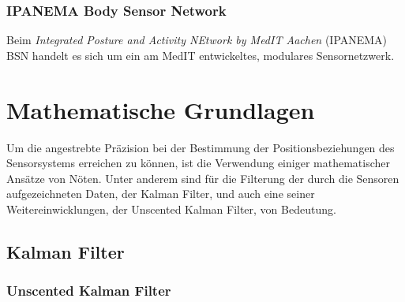 \subsubsection{IPANEMA Body Sensor Network}
Beim \textit{Integrated Posture and Activity NEtwork by MedIT Aachen} (IPANEMA) BSN handelt es sich um ein am MedIT entwickeltes, modulares Sensornetzwerk.


\section{Mathematische Grundlagen}
Um die angestrebte Präzision bei der Bestimmung der Positionsbeziehungen des Sensorsystems erreichen zu können, ist die Verwendung einiger mathematischer Ansätze von Nöten.
Unter anderem sind für die Filterung der durch die Sensoren aufgezeichneten Daten, der Kalman Filter, und auch eine seiner Weitereinwicklungen, der Unscented Kalman Filter, von Bedeutung.

\subsection{Kalman Filter}


\subsubsection{Unscented Kalman Filter}
